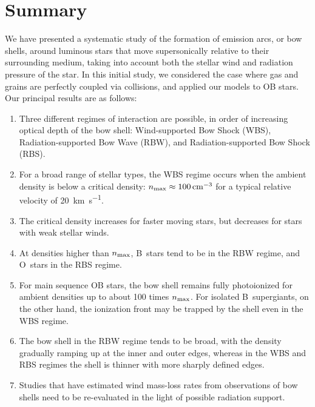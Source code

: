 \section{Summary}
\label{sec:summary}

We have presented a systematic study of the formation of emission
arcs, or bow shells, around luminous stars that move supersonically
relative to their surrounding medium, taking into account both the
stellar wind and radiation pressure of the star.  In this initial
study, we considered the case where gas and grains are perfectly
coupled via collisions, and applied our models to OB stars.  Our
principal results are as follows:
\begin{enumerate}[1.]
\item Three different regimes of interaction are possible, in order of
  increasing optical depth of the bow shell: Wind-supported Bow Shock
  (WBS), Radiation-supported Bow Wave (RBW), and Radiation-supported
  Bow Shock (RBS).
\item For a broad range of stellar types, the WBS regime occurs when
  the ambient density is below a critical density:
  \(n_{\text{max}} \approx \SI{100}{cm^{-3}}\) for a typical relative velocity of
  \SI{20}{km.s^{-1}}.
\item The critical density increases for faster moving stars, but
  decreases for stars with weak stellar winds.
\item At densities higher than \(n_{\text{max}}\), B~stars tend to be in the
  RBW regime, and O~stars in the RBS regime.
\item For main sequence OB stars, the bow shell remains fully
  photoionized for ambient densities up to about 100 times
  \(n_{\text{max}}\). For isolated B~supergiants, on the other hand, the
  ionization front may be trapped by the shell even in the WBS regime.
\item The bow shell in the RBW regime tends to be broad, with the
  density gradually ramping up at the inner and outer edges, whereas
  in the WBS and RBS regimes the shell is thinner with more sharply
  defined edges.
\item Studies that have estimated wind mass-loss rates from
  observations of bow shells need to be re-evaluated in the light of
  possible radiation support. 
\end{enumerate}



